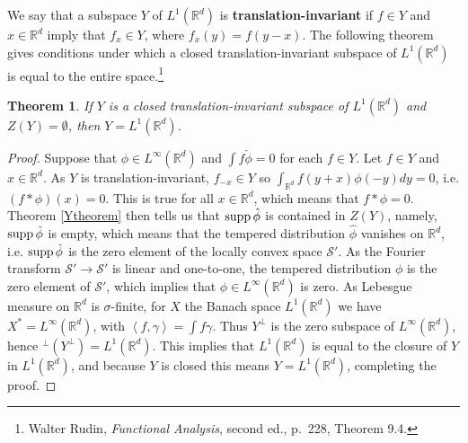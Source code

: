 \documentclass{article}
\newcommand{\inner}[2]{\left\langle #1, #2 \right\rangle}
\newcommand{\supp}{\ensuremath\mathrm{supp}\,}
\newtheorem{theorem}{Theorem}
\theoremstyle{definition}
\begin{document}
We say that a subspace $Y$ of $L^1(\mathbb{R}^d)$ is \textbf{translation-invariant} if $f \in Y$ and $x \in \mathbb{R}^d$ imply
that $f_x \in Y$, where $f_x(y)=f(y-x)$. The following theorem gives conditions under which a closed translation-invariant
subspace of $L^1(\mathbb{R}^d)$ is equal to the entire space.\footnote{Walter Rudin, {\em Functional Analysis}, second ed.,
p.~228, Theorem 9.4.}

\begin{theorem}
If $Y$ is a closed translation-invariant subspace of $L^1(\mathbb{R}^d)$ and $Z(Y)=\emptyset$, then
$Y=L^1(\mathbb{R}^d)$. 
\label{translationinvariant}
\end{theorem}
\begin{proof}
Suppose that $\phi \in L^\infty(\mathbb{R}^d)$ and $\int f \check{\phi}=0$ for each $f \in Y$. 
Let $f \in Y$ and $x \in \mathbb{R}^d$.
As $Y$ is translation-invariant, $f_{-x} \in Y$ so $\int_{\mathbb{R}^d} f(y+x) \phi(-y) dy=0$, i.e.
$(f*\phi)(x)=0$. This is true for all $x \in \mathbb{R}^d$, which means that $f*\phi = 0$. 
Theorem \ref{Ytheorem} then tells us that $\supp \hat{\phi}$ is contained in
$Z(Y)$, namely, $\supp \hat{\phi}$ is empty, which  means that the tempered distribution $\hat{\phi}$ vanishes
on $\mathbb{R}^d$, i.e. $\supp \hat{\phi}$ is the zero element of the locally convex space $\mathscr{S}'$. 
As the Fourier transform $\mathscr{S}' \to \mathscr{S}'$ is linear and one-to-one, 
the tempered distribution $\phi$ is the zero element of $\mathscr{S}'$, which implies that $\phi \in
L^\infty(\mathbb{R}^d)$ is zero.
As Lebesgue measure on $\mathbb{R}^d$ is $\sigma$-finite, 
for $X$ the Banach space $L^1(\mathbb{R}^d)$ we have
$X^*=L^\infty(\mathbb{R}^d)$, with $\inner{f}{\gamma}=\int f \gamma$. Thus $Y^\perp$ is the zero subspace of $L^\infty(\mathbb{R}^d)$, hence
$^\perp (Y^\perp)=L^1(\mathbb{R}^d)$. This implies that $L^1(\mathbb{R}^d)$ is equal to the closure of $Y$ in $L^1(\mathbb{R}^d)$, and because
$Y$ is closed this means $Y=L^1(\mathbb{R}^d)$, completing the proof.
\end{proof}
\end{document}
